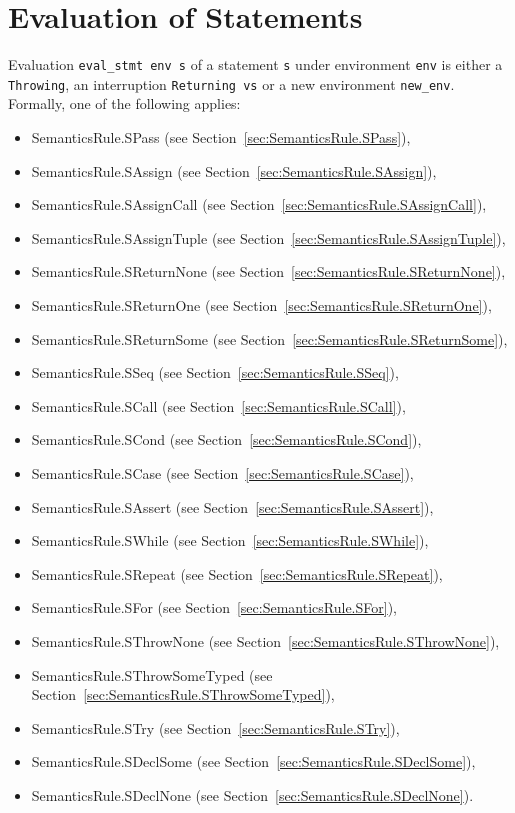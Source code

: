 \documentclass{book}
\begin{document}

\chapter{Evaluation of Statements \label{chap:eval_stmt}}
Evaluation \texttt{eval\_stmt env s} of a statement \texttt{s} under
environment \texttt{env} is either a \texttt{Throwing}, an interruption
\texttt{Returning vs} or a new environment \texttt{new\_env}. Formally, one of
the following applies:
\begin{itemize}
\item SemanticsRule.SPass (see Section~\ref{sec:SemanticsRule.SPass}),
\item SemanticsRule.SAssign (see Section~\ref{sec:SemanticsRule.SAssign}),
\item SemanticsRule.SAssignCall (see Section~\ref{sec:SemanticsRule.SAssignCall}),
\item SemanticsRule.SAssignTuple (see Section~\ref{sec:SemanticsRule.SAssignTuple}),
\item SemanticsRule.SReturnNone (see Section~\ref{sec:SemanticsRule.SReturnNone}),
\item SemanticsRule.SReturnOne (see Section~\ref{sec:SemanticsRule.SReturnOne}),
\item SemanticsRule.SReturnSome (see Section~\ref{sec:SemanticsRule.SReturnSome}),
\item SemanticsRule.SSeq (see Section~\ref{sec:SemanticsRule.SSeq}),
\item SemanticsRule.SCall (see Section~\ref{sec:SemanticsRule.SCall}),
\item SemanticsRule.SCond (see Section~\ref{sec:SemanticsRule.SCond}),
\item SemanticsRule.SCase (see Section~\ref{sec:SemanticsRule.SCase}),
\item SemanticsRule.SAssert (see Section~\ref{sec:SemanticsRule.SAssert}),
\item SemanticsRule.SWhile (see Section~\ref{sec:SemanticsRule.SWhile}),
\item SemanticsRule.SRepeat (see Section~\ref{sec:SemanticsRule.SRepeat}),
\item SemanticsRule.SFor (see Section~\ref{sec:SemanticsRule.SFor}),
\item SemanticsRule.SThrowNone (see Section~\ref{sec:SemanticsRule.SThrowNone}),
\item SemanticsRule.SThrowSomeTyped (see Section~\ref{sec:SemanticsRule.SThrowSomeTyped}),
\item SemanticsRule.STry (see Section~\ref{sec:SemanticsRule.STry}),
\item SemanticsRule.SDeclSome (see Section~\ref{sec:SemanticsRule.SDeclSome}),
\item SemanticsRule.SDeclNone (see Section~\ref{sec:SemanticsRule.SDeclNone}).
\end{itemize}
\end{document}
